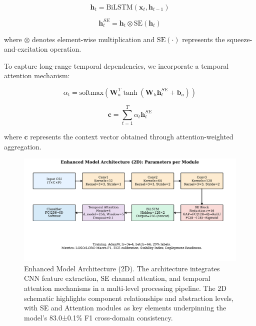 \documentclass[journal]{IEEEtran}
\begin{document}
\begin{equation}
\mathbf{h}_t = \text{BiLSTM}(\mathbf{x}_t, \mathbf{h}_{t-1})
\end{equation}

\begin{equation}
\mathbf{h}_t^{SE} = \mathbf{h}_t \otimes \text{SE}(\mathbf{h}_t)
\end{equation}

where $\otimes$ denotes element-wise multiplication and $\text{SE}(\cdot)$ represents the squeeze-and-excitation operation.

To capture long-range temporal dependencies, we incorporate a temporal attention mechanism:

\begin{equation}
\alpha_t = \text{softmax}(\mathbf{W}_a^T \tanh(\mathbf{W}_h \mathbf{h}_t^{SE} + \mathbf{b}_a))
\end{equation}

\begin{equation}
\mathbf{c} = \sum_{t=1}^{T} \alpha_t \mathbf{h}_t^{SE}
\end{equation}

where $\mathbf{c}$ represents the context vector obtained through attention-weighted aggregation.

\begin{figure}[ht]
\centering
\includegraphics[width=\columnwidth]{figures/fig3_enhanced_model_dataflow.pdf}%
\caption{Enhanced Model Architecture (2D). The architecture integrates CNN feature extraction, SE channel attention, and temporal attention mechanisms in a multi-level processing pipeline. The 2D schematic highlights component relationships and abstraction levels, with SE and Attention modules as key elements underpinning the model's 83.0±0.1\% F1 cross-domain consistency.}
\label{fig:enhanced_3d_arch}
\end{figure}
\end{document}
